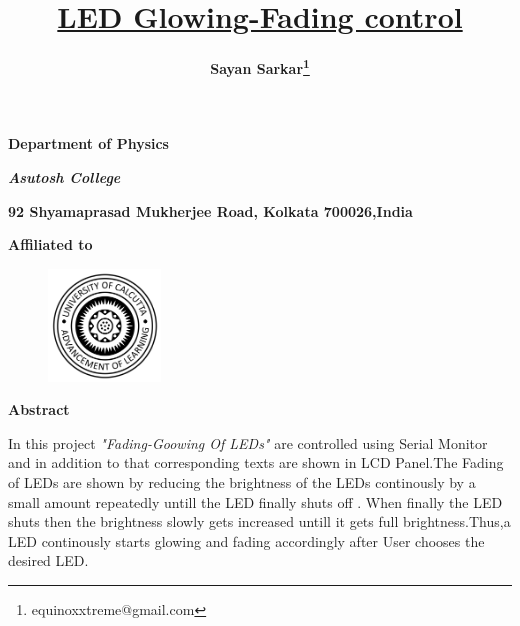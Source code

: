 \documentclass[a4paper]{article}
\begin{document}
\title{\Large{\textbf{\underline{LED Glowing-Fading control}}}}
\author{\textbf{\large{Sayan Sarkar\footnote{equinoxxtreme@gmail.com}}}}

\maketitle
\begin{center}
\end{center}
\begin{center}
 \textbf{Department of Physics}
\end{center}
\begin{center}
\large{\textbf{\textsl{Asutosh College}}}
\end{center}
\begin{center}
\textbf{92 Shyamaprasad Mukherjee Road, Kolkata 700026,India}
\end{center}

\begin{center}
 \textbf{Affiliated to}
\end{center}
\begin{figure}[h]
    \centering
    \includegraphics[width=3cm]{LOGO.png}
\end{figure}
\vspace{2cm}
\begin{center}
    \textbf{\textsf{\Large{Abstract}}}
\end{center}

In this project \textit{"Fading-Goowing Of LEDs"} are controlled using Serial Monitor and in addition to that corresponding texts are shown in LCD Panel.The Fading of LEDs are shown by reducing the brightness of the LEDs continously by a small amount repeatedly untill the LED finally shuts off . When finally the LED shuts then the brightness slowly gets increased untill it gets full brightness.Thus,a LED continously starts glowing and fading accordingly after User chooses the desired LED.  

\newpage
\begin{center}
\tableofcontents
\end{center}

\newpage
 
\end{document}
